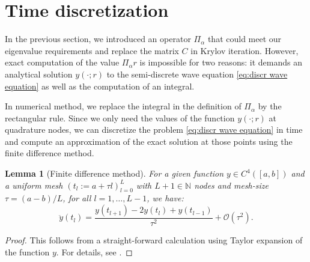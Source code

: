 \documentclass[a4paper,11pt,bibliography=totoc,listof=totoc,headinclude=true,cleardoublepage=empty,oneside]{scrbook}
\newtheorem{lemma}[theorem]{Lemma}
\newcommand{\N}{\mathbb{N}}
\newcommand{\bigO}{\mathcal{O}}
\begin{document}
\section{Time discretization}
In the previous section, we introduced an operator $\Pi_\alpha$ that could meet our eigenvalue requirements and replace the matrix $C$ in Krylov iteration. However, exact computation of the value $\Pi_\alpha r$ is impossible for two reasons: it demands an analytical solution $y(\cdot; r)$ to the semi-discrete wave equation \eqref{eq:discr wave equation} as well as the computation of an integral.

In numerical method, we replace the integral in the definition of $\Pi_\alpha$ by the rectangular rule. Since we only need the values of the function $y(\cdot; r)$ at quadrature nodes, we can discretize the problem \eqref{eq:discr wave equation} in time and compute an approximation of the exact solution at those points using the finite difference method.
\begin{lemma}[Finite difference method]\label{lemma:finite diffs}
    For a given function $y \in C^4 ([a, b])$ and a uniform mesh $(t_l := a+\tau l)_{l=0}^{L}$ with $L+1\in\N$ nodes and mesh-size $\tau = (a-b)/L$, for all $l=1, \dots, L-1$, we have:
    \begin{equation*}
        \ddot{y}(t_l) = \frac{y(t_{l+1}) - 2 y(t_l) + y(t_{l-1})}{\tau^2} + \bigO(\tau^2).
    \end{equation*}
\end{lemma}
\begin{proof}
    This follows from a straight-forward calculation using Taylor expansion of the function $y$. For details, see \cite[p. 93]{numodes}.
\end{proof}
\end{document}
